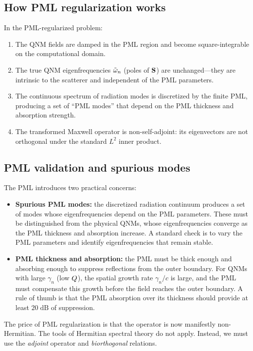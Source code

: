 \subsection{How PML regularization works}
\label{ssec:pml-mechanism}

In the PML-regularized problem:
\begin{enumerate}
 \item The QNM fields are damped in the PML region and become
 square-integrable on the computational domain.
 \item The true QNM eigenfrequencies $\tilde{\omega}_n$ (poles of $\mathbf{S}$) are
 unchanged---they are intrinsic to the scatterer and independent
 of the PML parameters.
 \item The continuous spectrum of radiation modes is discretized by the
 finite PML, producing a set of ``PML modes'' that depend on the
 PML thickness and absorption strength.
 \item The transformed Maxwell operator is non-self-adjoint: its
 eigenvectors are not orthogonal under the standard $L^2$ inner
 product.
\end{enumerate}

\subsection{PML validation and spurious modes}
\label{ssec:pml-validation}

The PML introduces two practical concerns:
\begin{itemize}
 \item \textbf{Spurious PML modes:} the discretized radiation continuum
 produces a set of modes whose eigenfrequencies depend on the PML
 parameters. These must be distinguished from the physical QNMs,
 whose eigenfrequencies converge as the PML thickness and absorption
 increase. A standard check is to vary the PML parameters and
 identify eigenfrequencies that remain stable.
 \item \textbf{PML thickness and absorption:} the PML must be thick
 enough and absorbing enough to suppress reflections from the outer
 boundary. For QNMs with large $\gamma_n$ (low $Q$), the spatial
 growth rate $\gamma_n/c$ is large, and the PML must compensate this
 growth before the field reaches the outer boundary. A rule of thumb
 is that the PML absorption over its thickness should provide at least
 $20\;\mathrm{dB}$ of suppression.
\end{itemize}

The price of PML regularization is that the operator is now manifestly
non-Hermitian. The tools of Hermitian spectral theory do not apply.
Instead, we must use the \emph{adjoint} operator and \emph{biorthogonal}
relations.

